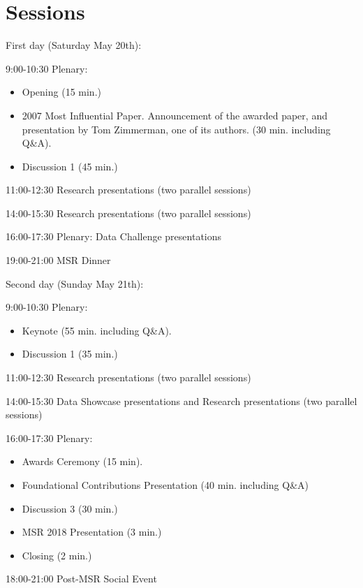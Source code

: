 \documentclass[a4paper]{report}
\begin{document}
\section{Sessions}

First day (Saturday May 20th):

\begin{description}
\item{9:00-10:30 Plenary:}
  \begin{itemize}
  \item Opening (15 min.)
  \item 2007 Most Influential Paper. Announcement of the awarded paper, and presentation by Tom Zimmerman, one of its authors. (30 min. including Q\&A).
  \item Discussion 1 (45 min.)
  \end{itemize}

\item{11:00-12:30 Research presentations} (two parallel sessions)

\item{14:00-15:30 Research presentations} (two parallel sessions)

\item{16:00-17:30 Plenary: Data Challenge presentations}
  
\item{19:00-21:00 MSR Dinner}

\end{description}


Second day (Sunday May 21th):

\begin{description}
\item{9:00-10:30 Plenary:}
  \begin{itemize}
  \item Keynote (55 min. including Q\&A).
  \item Discussion 1 (35 min.)
  \end{itemize}

\item{11:00-12:30 Research presentations} (two parallel sessions)

\item{14:00-15:30 Data Showcase presentations and Research presentations} (two parallel sessions)

\item{16:00-17:30 Plenary:}
  \begin{itemize}
  \item Awards Ceremony (15 min).
  \item Foundational Contributions Presentation (40 min. including Q\&A)
  \item Discussion 3 (30 min.)
  \item MSR 2018 Presentation (3 min.)
  \item Closing (2 min.)
  \end{itemize}
  
\item{18:00-21:00 Post-MSR Social Event}
\end{description}
\end{document}
